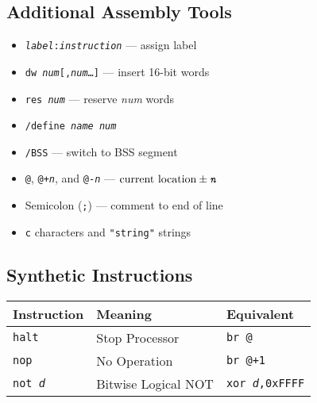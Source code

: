 \documentclass[12pt,english]{book}
\begin{document}
\vspace*{\belowdisplayskip}%
\noindent\begin{minipage}[t]{0.6\textwidth}
\subsection*{Additional Assembly Tools}
\begin{itemize}[noitemsep,topsep=0pt]
\item \texttt{\textit{label}:\@ \textit{instruction}} --- assign label
\item \texttt{dw \textit{num}[,\textit{num}\dots]} ---
  insert 16-bit words
\item \texttt{res \textit{num}} --- reserve \textit{num} words
\item \texttt{/define \textit{name} \textit{num}}
\item \texttt{/BSS} --- switch to BSS segment
\item \texttt{@}, \texttt{@+\textit{n}}, and \texttt{@-\textit{n}} ---
  \(\text{current location}\pm\text{\texttt{\textit{n}}}\)
\item Semicolon (\texttt{;}) --- comment to end of line
\item \texttt{\textquotesingle c\textquotesingle} characters
  and \texttt{"string"} strings
\end{itemize}\nointerlineskip

\subsection*{Synthetic Instructions}
\begin{center}
  \begin{tabular}{lll}
    \toprule
    Instruction&Meaning&Equivalent\\
    \midrule
    \texttt{halt}&Stop Processor&\texttt{br @}\\
    \texttt{nop}&No Operation&\texttt{br @+1}\\
    \texttt{not \textit{d}}&Bitwise Logical NOT
    &\texttt{xor \textit{d},0xFFFF}\\
    \bottomrule
  \end{tabular}
\end{center}
\end{minipage}%
\begin{minipage}[t]{0.05\textwidth}\leavevmode\end{minipage}%
\end{document}
